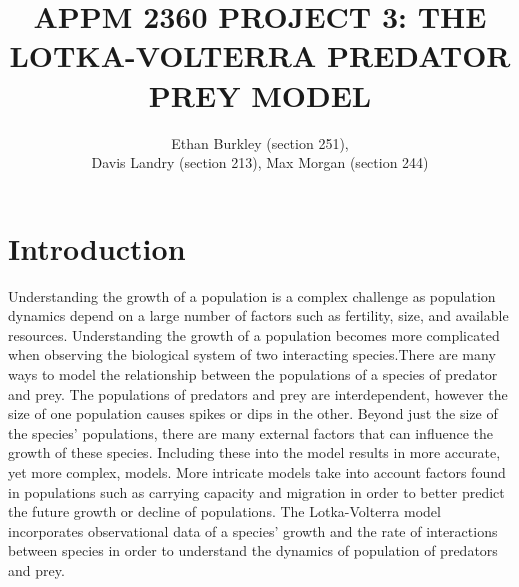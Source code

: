 \documentclass[12pt]{article}   %
\theoremstyle{definition}
\numberwithin{equation}{section}
\begin{document}
\parskip10pt
\parindent0pt
\baselineskip15pt



\title{APPM 2360 PROJECT 3: THE LOTKA-VOLTERRA PREDATOR PREY MODEL}
\author{Ethan Burkley (section 251), \\ Davis Landry (section 213), Max Morgan (section 244)}


\pagestyle{fancy}
\renewcommand{\sectionmark}[1]{\markright{#1}{}}

\fancyhf{}

\rhead{\fancyplain{}{\thepage}} %
\lhead{\fancyplain{}{\rightmark }} %

\maketitle

\newpage
\setcounter{page}{2}
\section{Introduction} \label{APPM2360proj01sec01}
\quad Understanding the growth of a population is a complex challenge as population dynamics depend on a large number of factors such as fertility, size, and available resources. Understanding the growth of a population becomes more complicated when observing the biological system of two interacting species.There are many ways to model the relationship between the populations of a species of predator and prey. The populations of predators and prey are interdependent, however the size of one population causes spikes or dips in the other. Beyond just the size of the species' populations, there are many external factors that can influence the growth of these species. Including these into the model results in more accurate, yet more complex, models. More intricate models take into account factors found in populations such as carrying capacity and migration in order to better predict the future growth or decline of populations. The Lotka-Volterra model incorporates observational data of a species' growth and the rate of interactions between species in order to understand the dynamics of population of predators and prey. 
 
\setcounter{page}{3}
\end{document}

